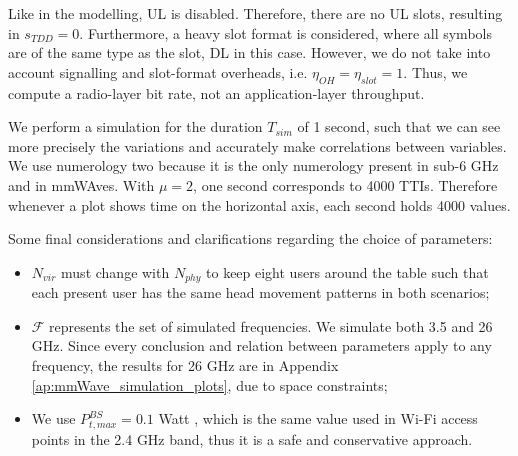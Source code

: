 Like in the modelling, UL is disabled. Therefore, there are no UL slots, resulting in $s_{TDD} = 0$. Furthermore, a heavy slot format is considered, where all symbols are of the same type as the slot, DL in this case. However, we do not take into account signalling and slot-format overheads, i.e. $\eta_{OH} = \eta_{slot} = 1$. Thus, we compute a radio-layer bit rate, not an application-layer throughput. 

We perform a simulation for the duration $T_{sim}$ of 1 second, such that we can see more precisely the variations and accurately make correlations between variables. We use numerology two because it is the only numerology present in sub-6 GHz and in mmWAves. With $\mu=2$, one second corresponds to 4000 TTIs. Therefore whenever a plot shows time on the horizontal axis, each second holds 4000 values.

Some final considerations and clarifications regarding the choice of parameters:

\begin{itemize}
    \item $N_{vir}$ must change with $N_{phy}$ to keep eight users around the table such that each present user has the same head movement patterns in both scenarios;
    \item $\mathcal{F}$ represents the set of simulated frequencies. We simulate both 3.5 and 26 GHz. Since every conclusion and relation between parameters apply to any frequency, the results for 26 GHz are in Appendix \ref{ap:mmWave_simulation_plots}, due to space constraints;
    \item We use $P_{t,max}^{BS} = 0.1 $ Watt \cite{etsi_wifi_tx_power}, which is the same value used in Wi-Fi access points in the 2.4 GHz band, thus it is a safe and conservative approach.
\end{itemize}

